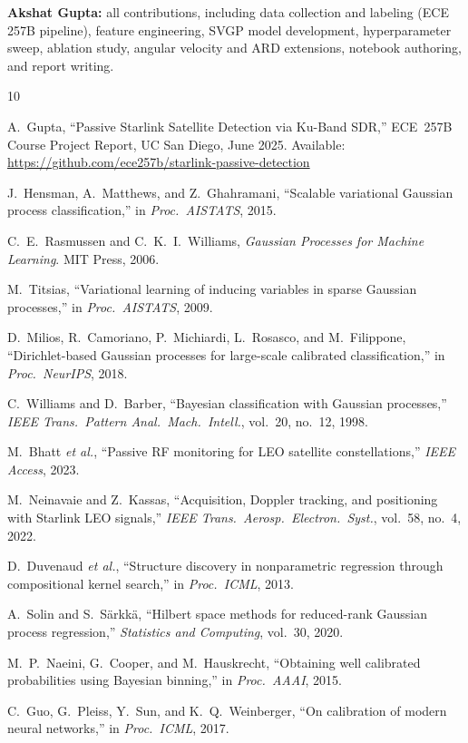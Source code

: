\documentclass{article}
\begin{document}
\textbf{Akshat Gupta:} all contributions, including data collection and labeling
(ECE\,257B pipeline), feature engineering, SVGP model development,
hyperparameter sweep, ablation study, angular velocity and ARD extensions,
notebook authoring, and report writing.

\begin{thebibliography}{10}

A.~Gupta, ``Passive Starlink Satellite Detection via Ku-Band SDR,''
ECE~257B Course Project Report, UC San Diego, June 2025.
Available: \url{https://github.com/ece257b/starlink-passive-detection}

J.\ Hensman, A.\ Matthews, and Z.\ Ghahramani,
``Scalable variational Gaussian process classification,''
in \emph{Proc.\ AISTATS}, 2015.

C.\ E.\ Rasmussen and C.\ K.\ I.\ Williams,
\emph{Gaussian Processes for Machine Learning}.
MIT Press, 2006.

M.\ Titsias,
``Variational learning of inducing variables in sparse Gaussian processes,''
in \emph{Proc.\ AISTATS}, 2009.

D.\ Milios, R.\ Camoriano, P.\ Michiardi, L.\ Rosasco, and M.\ Filippone,
``Dirichlet-based Gaussian processes for large-scale calibrated classification,''
in \emph{Proc.\ NeurIPS}, 2018.

C.\ Williams and D.\ Barber,
``Bayesian classification with Gaussian processes,''
\emph{IEEE Trans.\ Pattern Anal.\ Mach.\ Intell.}, vol.\ 20, no.\ 12, 1998.

M.\ Bhatt \emph{et al.},
``Passive RF monitoring for LEO satellite constellations,''
\emph{IEEE Access}, 2023.

M.\ Neinavaie and Z.\ Kassas,
``Acquisition, Doppler tracking, and positioning with Starlink LEO signals,''
\emph{IEEE Trans.\ Aerosp.\ Electron.\ Syst.}, vol.\ 58, no.\ 4, 2022.

D.\ Duvenaud \emph{et al.},
``Structure discovery in nonparametric regression through compositional kernel search,''
in \emph{Proc.\ ICML}, 2013.

A.\ Solin and S.\ S\"{a}rkk\"{a},
``Hilbert space methods for reduced-rank Gaussian process regression,''
\emph{Statistics and Computing}, vol.\ 30, 2020.

M.\ P.\ Naeini, G.\ Cooper, and M.\ Hauskrecht,
``Obtaining well calibrated probabilities using Bayesian binning,''
in \emph{Proc.\ AAAI}, 2015.

C.\ Guo, G.\ Pleiss, Y.\ Sun, and K.\ Q.\ Weinberger,
``On calibration of modern neural networks,''
in \emph{Proc.\ ICML}, 2017.

\end{thebibliography}
\end{document}
